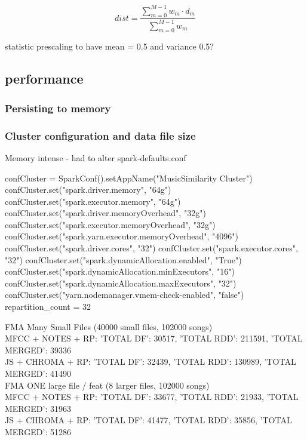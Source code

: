 \begin{equation} \label{eq:distance}
dist = \frac{\sum_{m = 0}^{M - 1}{w_m \cdot d_m}}{\sum_{m = 0}^{M - 1}{w_m}}
\end{equation}

statistic prescaling to have mean = 0.5 and variance 0.5?\\


\subsection{performance}\label{sparkperf}

\subsubsection{Persisting to memory}

\begin{pythonCode}[frame=single,label={lst:persist},caption={Spark persistence},captionpos=b]
	
\end{pythonCode}

\subsubsection{Cluster configuration and data file size}

Memory intense - had to alter spark-defaults.conf\\

\begin{pythonCode}[frame=single,label={lst:clust},caption={cluster setup},captionpos=b]
confCluster = SparkConf().setAppName("MusicSimilarity Cluster")
confCluster.set("spark.driver.memory", "64g")
confCluster.set("spark.executor.memory", "64g")
confCluster.set("spark.driver.memoryOverhead", "32g")
confCluster.set("spark.executor.memoryOverhead", "32g")
confCluster.set("spark.yarn.executor.memoryOverhead", "4096")
confCluster.set("spark.driver.cores", "32")
confCluster.set("spark.executor.cores", "32")
confCluster.set("spark.dynamicAllocation.enabled", "True")
confCluster.set("spark.dynamicAllocation.minExecutors", "16")
confCluster.set("spark.dynamicAllocation.maxExecutors", "32")
confCluster.set("yarn.nodemanager.vmem-check-enabled", "false")
repartition_count = 32
\end{pythonCode}

\noindent FMA Many Small Files (40000 small files, 102000 songs)\\
MFCC + NOTES + RP:      {'TOTAL DF': 30517, 'TOTAL RDD': 211591, 'TOTAL MERGED': 39336}\\
JS + CHROMA + RP:       {'TOTAL DF': 32439, 'TOTAL RDD': 130989, 'TOTAL MERGED': 41490}\\                               
FMA ONE large file / feat (8 larger files, 102000 songs)\\
MFCC + NOTES + RP:      {'TOTAL DF': 33677, 'TOTAL RDD': 21933, 'TOTAL MERGED': 31963}\\
JS + CHROMA + RP:       {'TOTAL DF': 41477, 'TOTAL RDD': 35856, 'TOTAL MERGED': 51286}    
                                    


